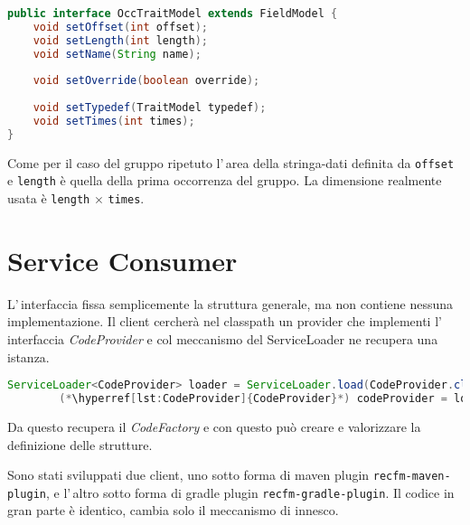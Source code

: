 \documentclass[a4paper,10pt]{report}
\begin{document}
\begin{figure*}[!htb]
\begin{lstlisting}[language=java, 
caption=interfaccia OccTraitModel (campo gruppo/interfaccia ripetuto), 
label=lst:OccTraitModel]
public interface OccTraitModel extends FieldModel {
    void setOffset(int offset);
    void setLength(int length);
    void setName(String name);
    
    void setOverride(boolean override);
    
    void setTypedef(TraitModel typedef);
    void setTimes(int times);
}
\end{lstlisting}
\end{figure*}
Come per il caso del gruppo ripetuto l'\,area della stringa-dati definita 
da \verb!offset! e \verb!length! è quella della prima occorrenza del gruppo. 
La dimensione realmente usata è \verb!length! $\times$ \verb!times!.


\chapter{Service Consumer}
L'\,interfaccia fissa semplicemente la struttura generale, ma non contiene 
nessuna implementazione.
Il client cercherà nel classpath un provider che implementi l'\,interfaccia
\textsl{CodeProvider} e col meccanismo del ServiceLoader ne recupera una istanza.

\begin{figure*}[!htb]
\begin{lstlisting}[language=java, caption=recupero del CodeProvider, 
label=lst:getCodeProvider]
        ServiceLoader<CodeProvider> loader = ServiceLoader.load(CodeProvider.class);
        (*\hyperref[lst:CodeProvider]{CodeProvider}*) codeProvider = loader.iterator().next();
\end{lstlisting}
\end{figure*}

Da questo recupera il \textsl{CodeFactory} e con questo può creare e valorizzare
la definizione delle strutture.

Sono stati sviluppati due client, uno sotto forma di maven plugin 
\verb!recfm-maven-plugin!, e l'\,altro sotto forma di gradle plugin 
\verb!recfm-gradle-plugin!. Il codice in gran parte è identico, cambia solo il 
meccanismo di innesco.
\end{document}

